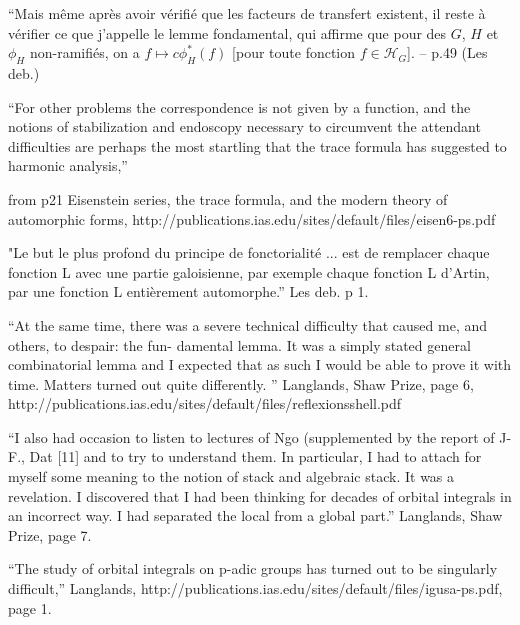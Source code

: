 \documentclass[brochure,english,12pt]{bourbaki}
\begin{document}
{\narrower \it

``Mais m\^eme apr\`es avoir
v\'erifi\'e que les facteurs de
transfert existent, il reste \`a v\'erifier ce que j'appelle le
lemme fondamental, qui affirme que pour des $G$, $H$ et $\phi_H$
non-ramifi\'es, on a $f\mapsto c \phi_H^*(f)$ [pour toute fonction $f\in {\mathcal H}_G$]. -- p.49 (Les deb.)  
}

\bigskip

``For other problems the correspondence is not given by a function, and the notions of 
stabilization and endoscopy necessary to circumvent the attendant difficulties are perhaps 
the most startling that the trace formula has suggested to harmonic analysis,'' 

from p21 Eisenstein series, the trace formula, and the modern theory of automorphic forms, http://publications.ias.edu/sites/default/files/eisen6-ps.pdf

"Le but le plus profond du principe de fonctorialit\'e ... est de remplacer chaque fonction L avec une partie galoisienne, par exemple chaque fonction L d'Artin, par une fonction L enti\`erement automorphe.'' Les deb. p 1.

``At the same 
time, there was a severe technical difficulty that caused me, and others, to despair: the fun- 
damental lemma. It was a simply stated general combinatorial lemma and I expected that as 
such I would be able to prove it with time. Matters turned out quite differently. ''  Langlands, Shaw Prize, page 6,
http://publications.ias.edu/sites/default/files/reflexionsshell.pdf

``I also had occasion to listen to lectures of Ngo (supplemented by the report of J-F., Dat [11] 
and to try to understand them. In particular, I had to attach for myself some meaning to the 
notion of stack and algebraic stack. It was a revelation. I discovered that I had been thinking 
for decades of orbital integrals in an incorrect way. I had separated the local from a global 
part.'' Langlands, Shaw Prize, page 7.



``The study of orbital integrals on p-adic groups has turned out to be singularly difficult,'' Langlands, 
http://publications.ias.edu/sites/default/files/igusa-ps.pdf,
page 1.

\end{document}
